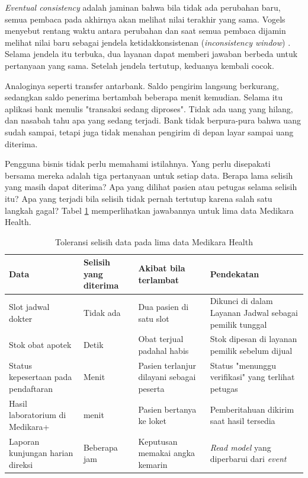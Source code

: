 \textit{Eventual consistency} adalah jaminan bahwa bila tidak ada perubahan baru, semua pembaca pada
akhirnya akan melihat nilai terakhir yang sama. Vogels menyebut rentang waktu antara perubahan dan
saat semua pembaca dijamin melihat nilai baru sebagai jendela ketidakkonsistenan
(\textit{inconsistency window}) \cite{c10-vogels2009}. Selama jendela itu terbuka, dua layanan dapat
memberi jawaban berbeda untuk pertanyaan yang sama. Setelah jendela tertutup, keduanya kembali cocok.

Analoginya seperti transfer antarbank. Saldo pengirim langsung berkurang, sedangkan saldo penerima
bertambah beberapa menit kemudian. Selama itu aplikasi bank menulis "transaksi sedang diproses".
Tidak ada uang yang hilang, dan nasabah tahu apa yang sedang terjadi. Bank tidak berpura-pura bahwa
uang sudah sampai, tetapi juga tidak menahan pengirim di depan layar sampai uang diterima.

Pengguna bisnis tidak perlu memahami istilahnya. Yang perlu disepakati bersama mereka adalah tiga
pertanyaan untuk setiap data. Berapa lama selisih yang masih dapat diterima? Apa yang dilihat pasien
atau petugas selama selisih itu? Apa yang terjadi bila selisih tidak pernah tertutup karena salah
satu langkah gagal? Tabel \ref{tab:ch10-kebutuhan-konsistensi} memperlihatkan jawabannya untuk lima
data Medikara Health.

\begin{table}[!htb]
  \centering
  \caption{Toleransi selisih data pada lima data Medikara Health}
  \label{tab:ch10-kebutuhan-konsistensi}
  \footnotesize
  \begin{tabularx}{\textwidth}{>{\raggedright\arraybackslash}p{2.6cm} >{\raggedright\arraybackslash}p{1.9cm} >{\raggedright\arraybackslash}X >{\raggedright\arraybackslash}X}
    \hline
    \textbf{Data} & \textbf{Selisih yang diterima} & \textbf{Akibat bila terlambat} &
      \textbf{Pendekatan} \\ \hline
    Slot jadwal dokter & Tidak ada & Dua pasien di satu slot & Dikunci di dalam Layanan Jadwal
      sebagai pemilik tunggal \\ \hline
    Stok obat apotek & Detik & Obat terjual padahal habis & Stok dipesan di layanan pemilik
      sebelum dijual \\ \hline
    Status kepesertaan pada pendaftaran & Menit & Pasien terlanjur dilayani sebagai peserta &
      Status "menunggu verifikasi" yang terlihat petugas \\ \hline
    Hasil laboratorium di Medikara+ & 5 menit & Pasien bertanya ke loket & Pemberitahuan dikirim
      saat hasil tersedia \\ \hline
    Laporan kunjungan harian direksi & Beberapa jam & Keputusan memakai angka kemarin &
      \textit{Read model} yang diperbarui dari \textit{event} \\ \hline
  \end{tabularx}
\end{table}

